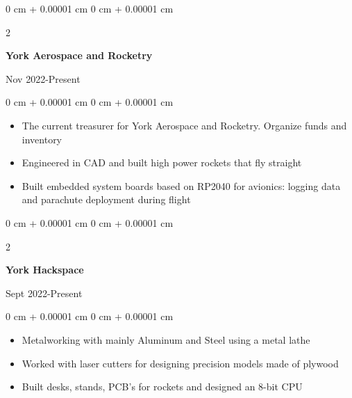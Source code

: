\documentclass[10pt, letterpaper]{article}
\newenvironment{onecolentry}{
    \begin{adjustwidth}{
        0 cm + 0.00001 cm
    }{
        0 cm + 0.00001 cm
    }
}{
    \end{adjustwidth}
} %
\newenvironment{twocolentry}[2][]{
    \onecolentry
    \def\secondColumn{#2}
    \setcolumnwidth{\fill, 4.5 cm}
    \begin{paracol}{2}
}{
    \switchcolumn \raggedleft \secondColumn
    \end{paracol}
    \endonecolentry
} %
\begin{document}
        
        \begin{samepage}
            \begin{twocolentry}{
                Nov 2022-Present
            }
                \textbf{York Aerospace and Rocketry}

                \vspace{0.10 cm}
            \end{twocolentry}


            \vspace{0.10 cm}

            \begin{onecolentry}
                \begin{itemize}
                    \item The current treasurer for York Aerospace and Rocketry. Organize funds and inventory
                    \item Engineered in CAD and built high power rockets that fly straight
                    \item Built embedded system boards based on RP2040 for avionics: logging data and parachute deployment during flight
                \end{itemize}
            \end{onecolentry}

        \vspace{0.10 cm}
        
        \begin{twocolentry}{
                Sept 2022-Present
            }
                \textbf{York Hackspace}

                \vspace{0.10 cm}
            \end{twocolentry}


            \vspace{0.10 cm}

            \begin{onecolentry}
                \begin{itemize}
                    \item Metalworking with mainly Aluminum and Steel using a metal lathe
                    \item Worked with laser cutters for designing precision models made of plywood
                    \item Built desks, stands, PCB's for rockets and designed an 8-bit CPU
                \end{itemize}
            \end{onecolentry}
        

\end{samepage}
\end{document}
